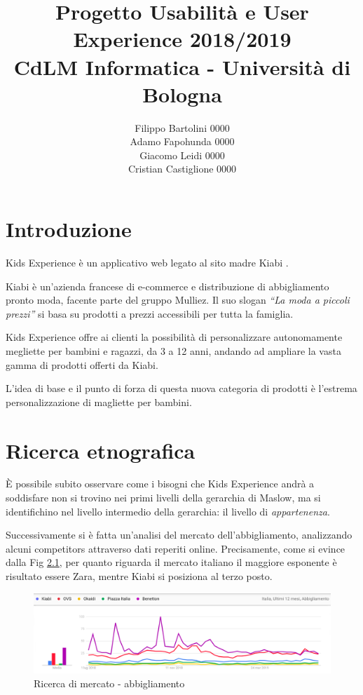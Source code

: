 \documentclass[12pt,italian,]{report}
\title{Progetto Usabilità e User Experience 2018/2019\\[0.8em]\large CdLM Informatica - Università di Bologna}
\author{Filippo Bartolini 0000 \\ Adamo Fapohunda 0000\\ Giacomo Leidi 0000 \\ Cristian Castiglione 0000}
\date{}
\begin{document}
\maketitle

{
\setcounter{tocdepth}{2}
\tableofcontents
}
\hypertarget{introduzione}{%
\chapter{Introduzione}\label{introduzione}}

Kids Experience è un applicativo web legato al sito madre Kiabi \cite{kiabi}.

Kiabi è un'azienda francese di e-commerce e distribuzione di
abbigliamento pronto moda, facente parte del gruppo Mulliez. Il suo
slogan \emph{``La moda a piccoli prezzi''} si basa su prodotti a prezzi
accessibili per tutta la famiglia.

Kids Experience offre ai clienti la possibilità di personalizzare
autonomamente megliette per bambini e ragazzi, da 3 a 12 anni, andando
ad ampliare la vasta gamma di prodotti offerti da Kiabi.

L'idea di base e il punto di forza di questa nuova categoria di prodotti è l'estrema personalizzazione di magliette per bambini.

\hypertarget{ricerca-etnografica}{%
\chapter{Ricerca etnografica}\label{ricerca-etnografica}}

È possibile subito osservare come i bisogni che Kids Experience andrà a
soddisfare non si trovino nei primi livelli della gerarchia di Maslow,
ma si identifichino nel livello intermedio della gerarchia: il livello
di \emph{appartenenza}.

Successivamente si è fatta un'analisi del mercato dell'abbigliamento,
analizzando alcuni competitors attraverso dati reperiti online.
Precisamente, come si evince dalla Fig \ref{abbigliamo_generico}, per quanto riguarda il
mercato italiano il maggiore esponente è risultato essere Zara, mentre Kiabi si
posiziona al terzo posto.

\begin{figure}[h]
\centering
\includegraphics{img/abbigliamento_generico.png}
\caption{Ricerca di mercato - abbigliamento}
\label{abbigliamo_generico}
\end{figure}
\end{document}
